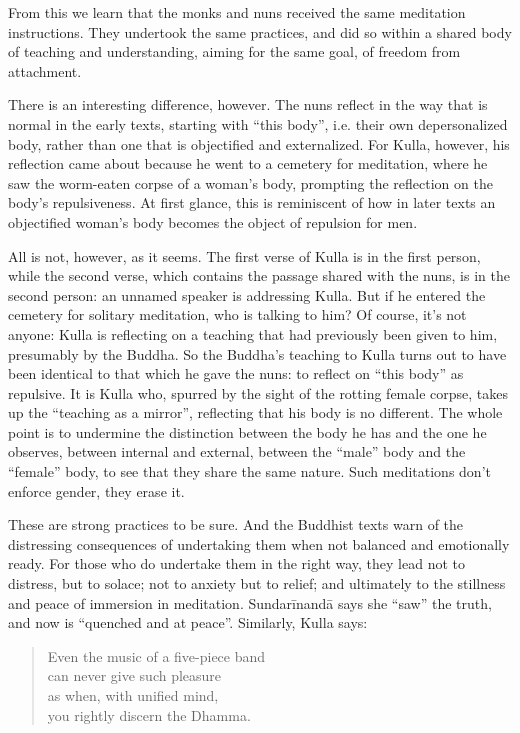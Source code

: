 \documentclass[12pt,openany]{book}%
\begin{document}
From this we learn that the monks and nuns received the same meditation instructions. They undertook the same practices, and did so within a shared body of teaching and understanding, aiming for the same goal, of freedom from attachment.

There is an interesting difference, however. The nuns reflect in the way that is normal in the early texts, starting with “this body”, i.e. their own depersonalized body, rather than one that is objectified and externalized. For Kulla, however, his reflection came about because he went to a cemetery for meditation, where he saw the worm-eaten corpse of a woman’s body, prompting the reflection on the body’s repulsiveness. At first glance, this is reminiscent of how in later texts an objectified woman’s body becomes the object of repulsion for men.

All is not, however, as it seems. The first verse of Kulla is in the first person, while the second verse, which contains the passage shared with the nuns, is in the second person: an unnamed speaker is addressing Kulla. But if he entered the cemetery for solitary meditation, who is talking to him? Of course, it’s not anyone: Kulla is reflecting on a teaching that had previously been given to him, presumably by the Buddha. So the Buddha’s teaching to Kulla turns out to have been identical to that which he gave the nuns: to reflect on “this body” as repulsive. It is Kulla who, spurred by the sight of the rotting female corpse, takes up the “teaching as a mirror”, reflecting that his body is no different. The whole point is to undermine the distinction between the body he has and the one he observes, between internal and external, between the “male” body and the “female” body, to see that they share the same nature. Such meditations don’t enforce gender, they erase it.

These are strong practices to be sure. And the Buddhist texts warn of the distressing consequences of undertaking them when not balanced and emotionally ready. For those who do undertake them in the right way, they lead not to distress, but to solace; not to anxiety but to relief; and ultimately to the stillness and peace of immersion in meditation. \textsanskrit{Sundarīnandā} says she “saw” the truth, and now is “quenched and at peace”. Similarly, Kulla says:

\begin{verse}%
Even the music of a five-piece band \\
can never give such pleasure \\
as when, with unified mind, \\
you rightly discern the Dhamma.

%
\end{verse}
\end{document}
